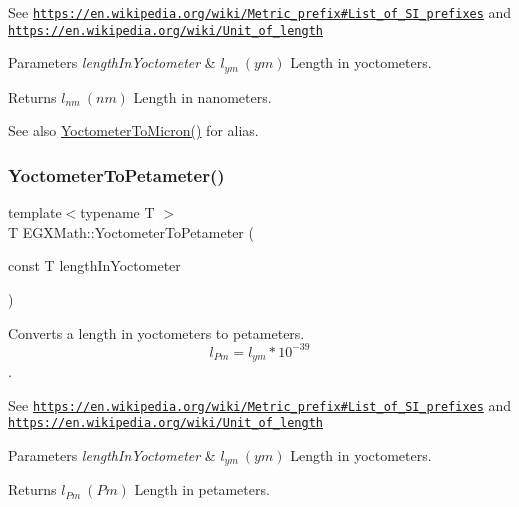 See \href{https://en.wikipedia.org/wiki/Metric_prefix#List_of_SI_prefixes}{\tt https\+://en.\+wikipedia.\+org/wiki/\+Metric\+\_\+prefix\#\+List\+\_\+of\+\_\+\+S\+I\+\_\+prefixes} and \href{https://en.wikipedia.org/wiki/Unit_of_length}{\tt https\+://en.\+wikipedia.\+org/wiki/\+Unit\+\_\+of\+\_\+length} 
\begin{DoxyParams}{Parameters}
{\em length\+In\+Yoctometer} & $ l_{ym}\ (ym)$ Length in yoctometers. \\
\hline
\end{DoxyParams}
\begin{DoxyReturn}{Returns}
$ l_{nm}\ (nm)$ Length in nanometers. 
\end{DoxyReturn}
\begin{DoxySeeAlso}{See also}
\mbox{\hyperlink{group___e_g_x_math-_conversions-_length_conversions-_yoctometer-_non-_s_i_ga4863fe4d5268ab023ec32d0281171b55}{Yoctometer\+To\+Micron()}} for alias. 
\end{DoxySeeAlso}
\mbox{\label{group___e_g_x_math-_conversions-_length_conversions-_yoctometer-_s_i_ga8336f2eef297fcf72ddb1fc0f79dfa5e}} 
\subsubsection{\texorpdfstring{Yoctometer\+To\+Petameter()}{YoctometerToPetameter()}}
{\footnotesize\ttfamily template$<$typename T $>$ \\
T E\+G\+X\+Math\+::\+Yoctometer\+To\+Petameter (\begin{DoxyParamCaption}\item[{const T}]{length\+In\+Yoctometer }\end{DoxyParamCaption})}



Converts a length in yoctometers to petameters. \[ l_{Pm}=l_{ym} * 10^{-39} \]. 

See \href{https://en.wikipedia.org/wiki/Metric_prefix#List_of_SI_prefixes}{\tt https\+://en.\+wikipedia.\+org/wiki/\+Metric\+\_\+prefix\#\+List\+\_\+of\+\_\+\+S\+I\+\_\+prefixes} and \href{https://en.wikipedia.org/wiki/Unit_of_length}{\tt https\+://en.\+wikipedia.\+org/wiki/\+Unit\+\_\+of\+\_\+length} 
\begin{DoxyParams}{Parameters}
{\em length\+In\+Yoctometer} & $ l_{ym}\ (ym)$ Length in yoctometers. \\
\hline
\end{DoxyParams}
\begin{DoxyReturn}{Returns}
$ l_{Pm}\ (Pm)$ Length in petameters. 
\end{DoxyReturn}
\mbox{\label{group___e_g_x_math-_conversions-_length_conversions-_yoctometer-_s_i_gab621b78b78d6776131912bd6038901b9}} 
